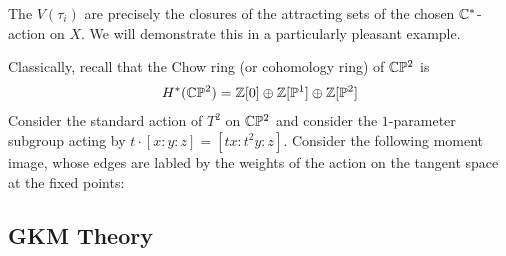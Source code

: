 The $V(\tau_i)$ are precisely the closures of the attracting sets 
of the chosen $\mathbb{C}^*$-action on $X$. We will demonstrate this in a particularly
pleasant example.
\begin{example}
    Classically, recall that the Chow ring (or cohomology ring) of
     $\mathbb{C}\mathbb{P}^2$ is \begin{align*}
        H^*(\mathbb{C}\mathbb{P}^2) = \mathbb{Z}[0] \oplus \mathbb{Z}[\mathbb{P}^1] \oplus \mathbb{Z}[\mathbb{P}^2]
    \end{align*} Consider the standard action of $T^2$ on $\mathbb{C}\mathbb{P}^2$
    and consider the $1$-parameter subgroup acting by $t\cdot[x:y:z] = [tx:t^2y:z]$.
    Consider the following moment image, whose 
    edges are labled by the weights of the action on the tangent space at the fixed points:
    
\end{example}


\subsection{GKM Theory}
